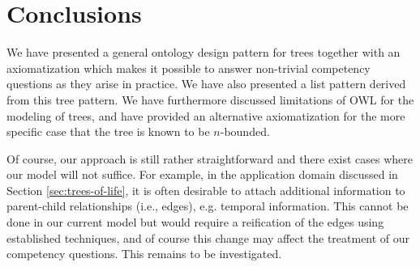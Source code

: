 \section{Conclusions}\label{sec:conclusion}

We have presented a general ontology design pattern for trees together with an axiomatization which makes it possible to answer non-trivial competency questions as they arise in practice. We have also presented a list pattern derived from this tree pattern. We have furthermore discussed limitations of OWL for the modeling of trees, and have provided an alternative axiomatization for the more specific case that the tree is known to be $n$-bounded.

Of course, our approach is still rather straightforward and there exist cases where our model will not suffice. For example, in the application domain discussed in Section \ref{sec:trees-of-life}, it is often desirable to attach additional information to parent-child relationships (i.e., edges), e.g. temporal information. This cannot be done in our current model but would require a reification of the edges using established techniques, and of course this change may affect the treatment of our competency questions. This remains to be investigated.


